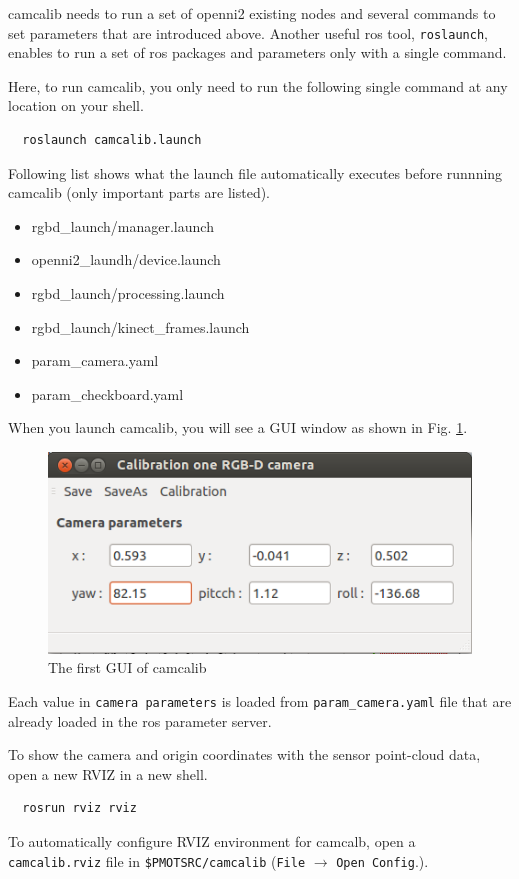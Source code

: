 \documentclass[a4paper,twoside, openright,12pt]{report}
\begin{document}
camcalib needs to run a set of openni2 existing nodes and several commands to set parameters that are introduced above.
Another useful ros tool, \verb|roslaunch|, enables to run a set of ros packages and parameters only with a single command.

Here, to run camcalib, you only need to run the following single command at any location on your shell. 
\begin{verbatim}
  roslaunch camcalib.launch
\end{verbatim}

Following list shows what the launch file automatically executes before runnning camcalib (only important parts are listed).
\begin{itemize}
	\item rgbd\_launch/manager.launch
	\item openni2\_laundh/device.launch
	\item rgbd\_launch/processing.launch
	\item rgbd\_launch/kinect\_frames.launch
	\item param\_camera.yaml
	\item param\_checkboard.yaml
\end{itemize}

When you launch camcalib, you will see a GUI window as shown in Fig. \ref{fig:camcalib_gui1}.

\begin{figure}[b]
	\centering
	\includegraphics[width=0.5\linewidth]{fig/camcalib_gui1.png}
	\caption{The first GUI of camcalib}
	\label{fig:camcalib_gui1}
\end{figure}

Each value in \verb|camera parameters| is loaded from \verb|param_camera.yaml| file that are already loaded in the ros parameter server.

To show the camera and origin coordinates with the sensor point-cloud data, open a new RVIZ in a new shell. 

\begin{verbatim}
  rosrun rviz rviz
\end{verbatim}

To automatically configure RVIZ environment for camcalb, open a \verb|camcalib.rviz| file in \verb|$PMOTSRC/camcalib| (\verb|File| $\rightarrow$ \verb|Open Config|.).
\end{document}
